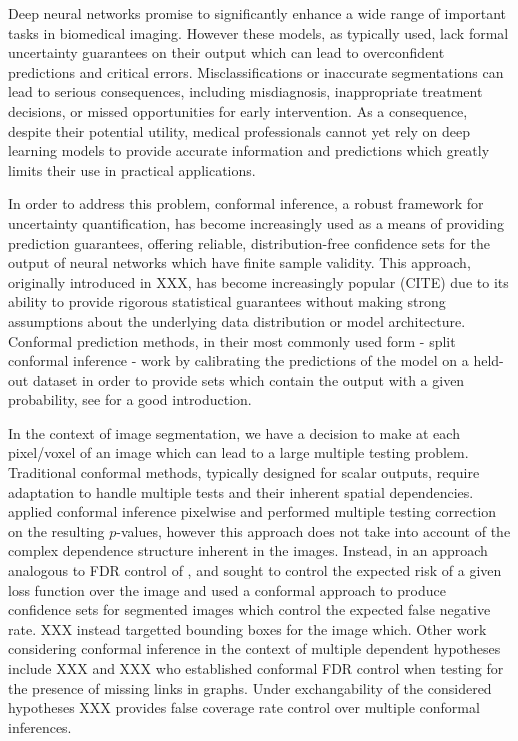 


Deep neural networks promise to significantly enhance a wide range of important tasks in biomedical imaging. However these models, as typically used, lack formal uncertainty guarantees on their output which can lead to overconfident predictions and critical errors. Misclassifications or inaccurate segmentations can lead to serious consequences, including misdiagnosis, inappropriate treatment decisions, or missed opportunities for early intervention.  As a consequence, despite their potential utility, medical professionals cannot yet rely on deep learning models to provide accurate information and predictions which greatly limits their use in practical applications. 

In order to address this problem, conformal inference, a robust framework for uncertainty quantification, has become increasingly used as a means of providing prediction guarantees, offering reliable, distribution-free confidence sets for the output of neural networks which have finite sample validity. This approach, originally introduced in XXX, has become increasingly popular (CITE) due to its ability to provide rigorous statistical guarantees without making strong assumptions about the underlying data distribution or model architecture. Conformal prediction methods, in their most commonly used form - split conformal inference - work by calibrating the predictions of the model on a held-out dataset in order to provide sets which contain the output with a given probability, see \cite{Angelopoulos2021} for a good introduction.

In the context of image segmentation, we have a decision to make at each pixel/voxel of an image which can lead to a large multiple testing problem. Traditional conformal methods, typically designed for scalar outputs, require adaptation to handle multiple tests and their inherent spatial dependencies. \cite{Angelopoulos2021LTT} applied conformal inference pixelwise and performed multiple testing correction on the resulting $p$-values, however this approach does not take into account of the complex dependence structure inherent in the images. Instead, in an approach analogous to FDR control of \citep{Benjamini1995}, \cite{Bates2021} and \cite{Angelopoulos2022} sought to control the expected risk of a given loss function over the image and used a conformal approach to produce confidence sets for segmented images which control the expected false negative rate. XXX instead targetted bounding boxes for the image which. Other work considering conformal inference in the context of multiple dependent hypotheses include XXX and XXX who established conformal FDR control when testing for the presence of missing links in graphs. Under exchangability of the considered hypotheses XXX provides false coverage rate control over multiple conformal inferences.

